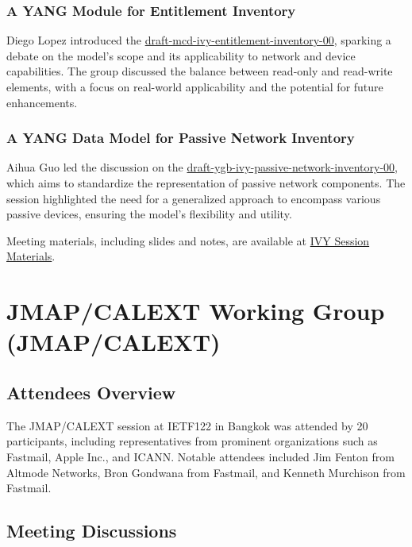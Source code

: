 \documentclass{article}
\begin{document}
\subsubsection{A YANG Module for Entitlement Inventory}
Diego Lopez introduced the \href{https://datatracker.ietf.org/doc/draft-mcd-ivy-entitlement-inventory-00}{draft-mcd-ivy-entitlement-inventory-00}, sparking a debate on the model's scope and its applicability to network and device capabilities. The group discussed the balance between read-only and read-write elements, with a focus on real-world applicability and the potential for future enhancements.

\subsubsection{A YANG Data Model for Passive Network Inventory}
Aihua Guo led the discussion on the \href{https://datatracker.ietf.org/doc/html/draft-ygb-ivy-passive-network-inventory-00}{draft-ygb-ivy-passive-network-inventory-00}, which aims to standardize the representation of passive network components. The session highlighted the need for a generalized approach to encompass various passive devices, ensuring the model's flexibility and utility.

Meeting materials, including slides and notes, are available at \href{https://datatracker.ietf.org/meeting/122/session/ivy}{IVY Session Materials}.




\newpage

\section{JMAP/CALEXT Working Group (JMAP/CALEXT)}

\subsection{Attendees Overview}
The JMAP/CALEXT session at IETF122 in Bangkok was attended by 20 participants, including representatives from prominent organizations such as Fastmail, Apple Inc., and ICANN. Notable attendees included Jim Fenton from Altmode Networks, Bron Gondwana from Fastmail, and Kenneth Murchison from Fastmail.

\subsection{Meeting Discussions}
\end{document}
